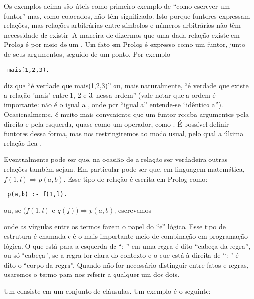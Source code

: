 \documentclass{article}
\begin{document}
Os exemplos acima são úteis como primeiro exemplo de ``como escrever um funtor'' mas, como colocados, não têm significado. Isto
porque funtores expressam relações, mas relações arbitrárias entre símbolos e números arbitrários não têm necessidade de existir.
A maneira de dizermos que uma dada relação existe em Prolog é por meio de um . Um fato em Prolog é expresso como
um funtor, junto de seus argumentos, seguido de um ponto. Por exemplo

{\tt
  mais(1,2,3).
}

\noindent diz que ``é verdade que mais(1,2,3)'' ou, mais naturalmente, ``é verdade que existe a relação 'mais' entre 1, 2 e 3, nessa ordem'' (vale notar que a ordem é importante:  não é o igual a , onde por ``igual a'' entende-se ``idêntico a'').
Ocasionalmente, é muito mais conveniente que um funtor receba argumentos pela direita e pela esquerda, quase como um operador,
como . É possível definir funtores dessa forma, mas nos restringiremos ao modo usual, pelo qual a última relação fica
.

Eventualmente pode ser que, na ocasião de a relação  ser verdadeira outras relações também sejam.
Em particular pode ser que, em linguagem matemática, $ f(1,l) \Rightarrow p(a,b) $. Esse tipo de relação é escrita em Prolog como:

{\tt
  p(a,b) :- f(1,l).
}

\noindent ou, se $ (f(1,l)$ e $q(f)) \Rightarrow p(a,b) $, escrevemos


\noindent onde as vírgulas entre os termos fazem o papel do ``e'' lógico. Esse tipo de estrutura é chamada 
e é o mais importante meio de combinação em programação lógica. O que está para a esquerda de ``:-'' em uma regra é dito
``cabeça da regra'', ou só ``cabeça'', se a regra for clara do contexto e o que está à direita de ``:-'' é dito o
``corpo da regra''. Quando não for necessário distinguir entre fatos e regras, usaremos o termo  para
nos referir a qualquer um dos dois.

Um  consiste em um conjunto de cláusulas. Um exemplo é o seguinte:\\

\inputminted{prolog}{../Exemplos/Cap0/prog1_cafe.pl}\label{lst:cafe}
\end{document}
